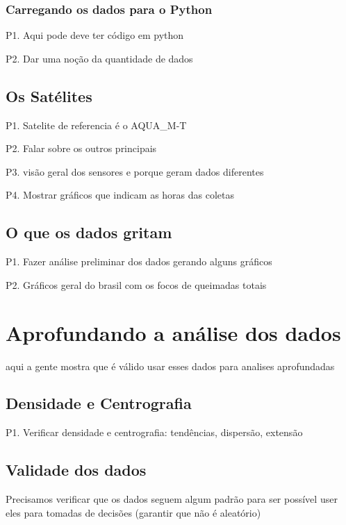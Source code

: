 \documentclass[cic,tc]{iiufrgs}
\begin{document}
\subsection{Carregando os dados para o Python} 

P1. Aqui pode deve ter código em python \par
P2. Dar uma noção da quantidade de dados \par

\section{Os Satélites}

P1. Satelite de referencia é o AQUA\_M-T \citep{PerguntasFrequentesINPE} \par
P2. Falar sobre os outros principais \par
P3. visão geral dos sensores e porque geram dados diferentes \par
P4. Mostrar gráficos que indicam as horas das coletas

\section{O que os dados gritam}

P1. Fazer análise preliminar dos dados gerando alguns gráficos \par
P2. Gráficos geral do brasil com os focos de queimadas totais \cite{geographicDataSciencePython} \par


\chapter{Aprofundando a análise dos dados}

aqui a gente mostra que é válido usar esses dados para analises aprofundadas

\section{Densidade e Centrografia}

P1. Verificar densidade e centrografia: tendências, dispersão, extensão \par

\section{Validade dos dados}

Precisamos verificar que os dados seguem algum padrão para ser possível
user eles para tomadas de decisões (garantir que não é aleatório) 
\cite[Point Pattern Analysis]{geographicDataSciencePython} \par
\end{document}

